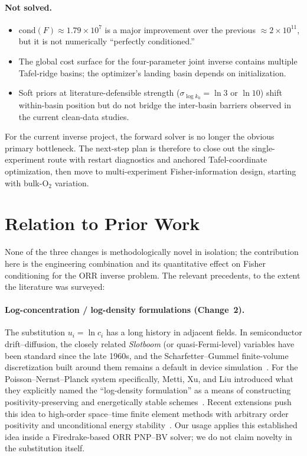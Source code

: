 \documentclass[11pt]{article}
\begin{document}
\paragraph{Not solved.}
\begin{itemize}
  \item $\mathrm{cond}(F) \approx 1.79\times 10^7$ is a major improvement over
        the previous $\approx 2\times 10^{11}$, but it is not numerically
        ``perfectly conditioned.''
  \item The global cost surface for the four-parameter joint inverse contains
        multiple Tafel-ridge basins; the optimizer's landing basin depends on
        initialization.
  \item Soft priors at literature-defensible strength
        ($\sigma_{\log k_0} = \ln 3$ or $\ln 10$) shift within-basin position
        but do not bridge the inter-basin barriers observed in the current
        clean-data studies.
\end{itemize}
For the current inverse project, the forward solver is no longer the obvious
primary bottleneck. The next-step plan is therefore to close out the
single-experiment route with restart diagnostics and anchored Tafel-coordinate
optimization, then move to multi-experiment Fisher-information design, starting
with bulk-$\mathrm{O}_2$ variation.

\section{Relation to Prior Work}
None of the three changes is methodologically novel in isolation; the
contribution here is the engineering combination and its quantitative effect
on Fisher conditioning for the ORR inverse problem. The relevant precedents,
to the extent the literature was surveyed:

\paragraph{Log-concentration / log-density formulations (Change~2).}
The substitution $u_i = \ln c_i$ has a long history in adjacent fields. In
semiconductor drift--diffusion, the closely related \emph{Slotboom} (or
quasi-Fermi-level) variables have been standard since the late 1960s, and
the Scharfetter--Gummel finite-volume discretization built around them
remains a default in device simulation~\cite{ScharfetterGummel1969}. For the
Poisson--Nernst--Planck system specifically, Metti, Xu, and Liu introduced
what they explicitly named the ``log-density formulation'' as a means of
constructing positivity-preserving and energetically stable
schemes~\cite{MettiXuLiu2016}. Recent extensions push this idea to high-order
space--time finite element methods with arbitrary order positivity and
unconditional energy stability~\cite{LiuMaxianShenZitelliWaltzMonteiro2022}.
Our usage applies this established idea inside a Firedrake-based ORR
PNP--BV solver; we do not claim novelty in the substitution itself.
\end{document}
